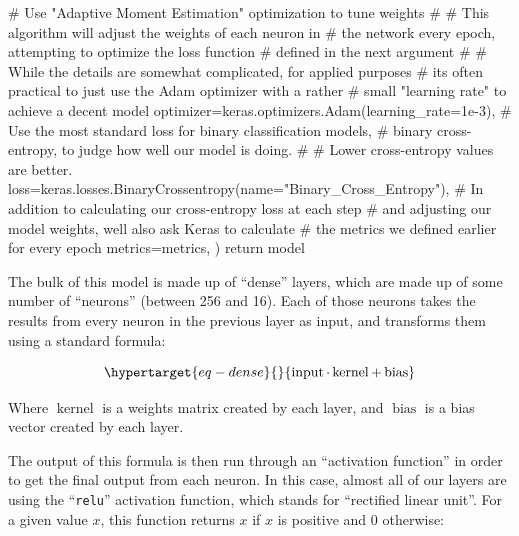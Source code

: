 \documentclass[
  letterpaper,
  DIV=11,
  numbers=noendperiod]{scrartcl}
\newenvironment{Shaded}{\begin{snugshade}}{\end{snugshade}}
\newcommand{\CommentTok}[1]{\textcolor[rgb]{0.37,0.37,0.37}{#1}}
\newcommand{\ControlFlowTok}[1]{\textcolor[rgb]{0.00,0.23,0.31}{#1}}
\newcommand{\FloatTok}[1]{\textcolor[rgb]{0.68,0.00,0.00}{#1}}
\newcommand{\NormalTok}[1]{\textcolor[rgb]{0.00,0.23,0.31}{#1}}
\newcommand{\OperatorTok}[1]{\textcolor[rgb]{0.37,0.37,0.37}{#1}}
\newcommand{\StringTok}[1]{\textcolor[rgb]{0.13,0.47,0.30}{#1}}
\begin{document}
\begin{Shaded}
\begin{Highlighting}[]
        \CommentTok{\# Use "Adaptive Moment Estimation" optimization to tune weights}
        \CommentTok{\#}
        \CommentTok{\# This algorithm will adjust the weights of each neuron in}
        \CommentTok{\# the network every epoch, attempting to optimize the loss function}
        \CommentTok{\# defined in the next argument}
        \CommentTok{\#}
        \CommentTok{\# While the details are somewhat complicated, for applied purposes}
        \CommentTok{\# it\textquotesingle{}s often practical to just use the Adam optimizer with a rather }
        \CommentTok{\# small "learning rate" to achieve a decent model}
\NormalTok{        optimizer}\OperatorTok{=}\NormalTok{keras.optimizers.Adam(learning\_rate}\OperatorTok{=}\FloatTok{1e{-}3}\NormalTok{),}
        \CommentTok{\# Use the most standard loss for binary classification models,}
        \CommentTok{\# binary cross{-}entropy, to judge how well our model is doing.}
        \CommentTok{\#}
        \CommentTok{\# Lower cross{-}entropy values are better.}
\NormalTok{        loss}\OperatorTok{=}\NormalTok{keras.losses.BinaryCrossentropy(name}\OperatorTok{=}\StringTok{"Binary\_Cross\_Entropy"}\NormalTok{),}
        \CommentTok{\# In addition to calculating our cross{-}entropy loss at each step}
        \CommentTok{\# and adjusting our model weights, we\textquotesingle{}ll also ask Keras to calculate}
        \CommentTok{\# the metrics we defined earlier for every epoch}
\NormalTok{        metrics}\OperatorTok{=}\NormalTok{metrics,}
\NormalTok{    )}
    \ControlFlowTok{return}\NormalTok{ model}
\end{Highlighting}
\end{Shaded}

The bulk of this model is made up of ``dense'' layers, which are made up
of some number of ``neurons'' (between 256 and 16). Each of those
neurons takes the results from every neuron in the previous layer as
input, and transforms them using a standard formula:

\begin{equation}\protect\hypertarget{eq-dense}{}{
\operatorname{input}\cdot{}\operatorname{kernel}+\operatorname{bias}
}\label{eq-dense}\end{equation}

Where \(\operatorname{kernel}\) is a weights matrix created by each
layer, and \(\operatorname{bias}\) is a bias vector created by each
layer.

The output of this formula is then run through an ``activation
function'' in order to get the final output from each neuron. In this
case, almost all of our layers are using the ``\texttt{relu}''
activation function, which stands for ``rectified linear unit''. For a
given value \(x\), this function returns \(x\) if \(x\) is positive and
0 otherwise:
\end{document}
